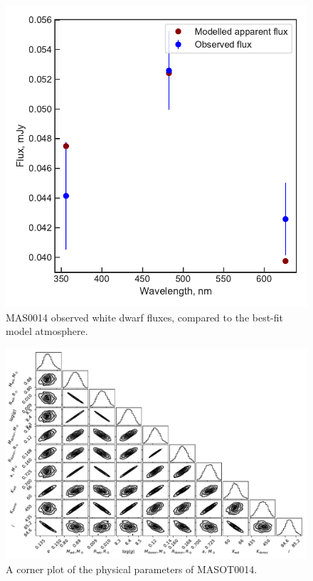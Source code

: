 \begin{figure}
    \centering
    \includegraphics[width=\textwidth]{figures/results/MASOT0014/fluxplot.pdf}
    \caption{MAS0014 observed white dwarf fluxes, compared to the best-fit model atmosphere.}
    \label{fig:MAS0014 flux plot}
\end{figure}
\begin{figure}
    \includegraphics[height=\textwidth, angle=90]{figures/results/physicalparams_corners/MASOT0014_physcorner.pdf}
    \caption{A corner plot of the physical parameters of MASOT0014.}
\end{figure}
\clearpage




